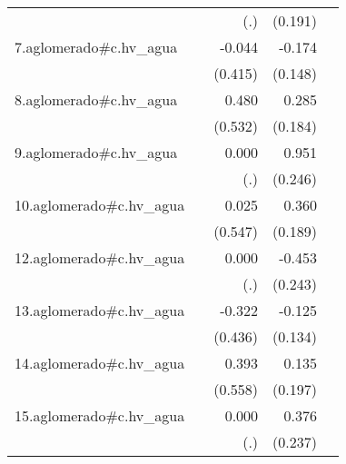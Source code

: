 {\begin{longtable}{l*{4}{D{.}{.}{-1}}}
            &                     &         (.)         &     (0.191)         &                     \\
\addlinespace
7.aglomerado#c.hv\_agua&                     &      -0.044         &      -0.174         &                     \\
            &                     &     (0.415)         &     (0.148)         &                     \\
\addlinespace
8.aglomerado#c.hv\_agua&                     &       0.480         &       0.285         &                     \\
            &                     &     (0.532)         &     (0.184)         &                     \\
\addlinespace
9.aglomerado#c.hv\_agua&                     &       0.000         &       0.951\sym{***}&                     \\
            &                     &         (.)         &     (0.246)         &                     \\
\addlinespace
10.aglomerado#c.hv\_agua&                     &       0.025         &       0.360         &                     \\
            &                     &     (0.547)         &     (0.189)         &                     \\
\addlinespace
12.aglomerado#c.hv\_agua&                     &       0.000         &      -0.453         &                     \\
            &                     &         (.)         &     (0.243)         &                     \\
\addlinespace
13.aglomerado#c.hv\_agua&                     &      -0.322         &      -0.125         &                     \\
            &                     &     (0.436)         &     (0.134)         &                     \\
\addlinespace
14.aglomerado#c.hv\_agua&                     &       0.393         &       0.135         &                     \\
            &                     &     (0.558)         &     (0.197)         &                     \\
\addlinespace
15.aglomerado#c.hv\_agua&                     &       0.000         &       0.376         &                     \\
            &                     &         (.)         &     (0.237)         &                     \\

\end{longtable}}
